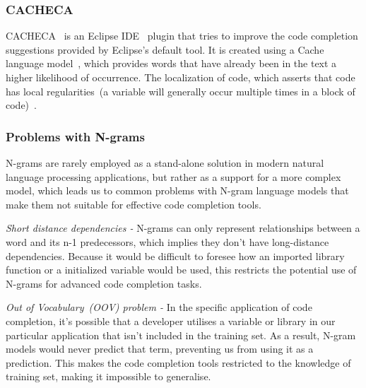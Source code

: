 \subsubsection{CACHECA}
CACHECA~\cite{cacheca} is an Eclipse IDE~\cite{eclipse} plugin that tries to improve the code completion suggestions provided by Eclipse's default tool. It is created using a Cache language model~\cite{localse}, which provides words that have already been in the text a higher likelihood of occurrence. The localization of code, which asserts that code has local regularities~(a variable will generally occur multiple times in a block of code)~\cite{localse}.

\subsubsection{Problems with N-grams}
N-grams are rarely employed as a stand-alone solution in modern natural language processing applications, but rather as a support for a more complex model, which leads us to common problems with N-gram language models that make them not suitable for effective code completion tools.

\emph{Short distance dependencies -} N-grams can only represent relationships between a word and its n-1 predecessors, which implies they don't have long-distance dependencies. Because it would be difficult to foresee how an imported library function or a initialized variable would be used, this restricts the potential use of N-grams for advanced code completion tasks.

\emph{Out of Vocabulary~(OOV) problem - } In the specific application of code completion, it's possible that a developer utilises a variable or library in our particular application that isn't included in the training set. 
As a result, N-gram models would never predict that term, preventing us from using it as a prediction. This makes the code completion tools restricted to the knowledge of training set, making it impossible to generalise.

